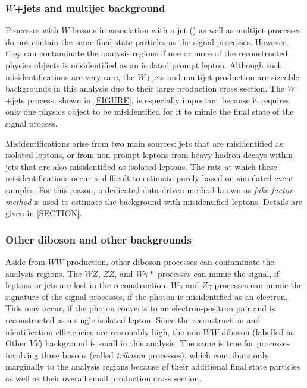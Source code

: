 \subsubsection{$W$+jets and multijet background}
Processes with $W$ bosons in association with a jet (\Wjets) as well as multijet processes do not contain the same final state particles as the signal processes. However, they can contaminate the analysis regions if one or more of the reconstructed physics objects is misidentified as an isolated prompt lepton. 
Although such misidentifications are very rare, the $W$+jets and multijet production are sizeable backgrounds in this analysis due to their large production cross section.
The $W$+jets process, shown in \cref{FIGURE}, is especially important because it requires only one physics object to be misidentified for it to mimic the final state of the signal process.

Misidentifications arise from two main sources: jets that are misidentified as isolated leptons, or from non-prompt leptons from heavy hadron decays within jets that are also misidentified as isolated leptons.
The rate at which these misidentifications occur is difficult to estimate purely based on simulated event samples. For this reason, a dedicated data-driven method known as \emph{fake factor method} is used to estimate the background with misidentified leptons. Details are given in \cref{SECTION}.


\subsubsection{Other diboson and other backgrounds}
Aside from $WW$ production, other diboson processes can contaminate the analysis regions. 
The $WZ$, $ZZ$, and $W\gamma*$ processes can mimic the signal, if leptons or jets are lost in the reconstruction. 
$W\gamma$ and $Z\gamma$ processes can mimic the signature of the signal processes, if the photon is misidentified as an electron. This may occur, if the photon converts to an electron-positron pair and is reconstructed as a single isolated lepton. 
Since the reconstruction and identification efficiencies are reasonably high, the non-$WW$ diboson (labelled as Other $VV$) background is small in this analysis.
The same is true for processes involving three bosons (called \emph{triboson} processes), which contribute only marginally to the analysis regions because of their additional final state particles as well as their overall small production cross section. 
